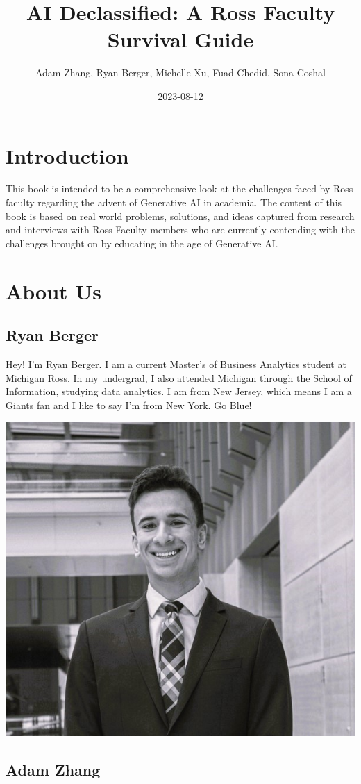 \documentclass[
]{book}
\title{AI Declassified: A Ross Faculty Survival Guide}
\author{Adam Zhang, Ryan Berger, Michelle Xu, Fuad Chedid, Sona Coshal}
\date{2023-08-12}
\begin{document}
\maketitle

{
\setcounter{tocdepth}{1}
\tableofcontents
}
\hypertarget{introduction}{%
\chapter{Introduction}\label{introduction}}

This book is intended to be a comprehensive look at the challenges faced by Ross faculty regarding the advent of Generative AI in academia. The content of this book is based on real world problems, solutions, and ideas captured from research and interviews with Ross Faculty members who are currently contending with the challenges brought on by educating in the age of Generative AI.

\hypertarget{about-us}{%
\chapter{About Us}\label{about-us}}

\hypertarget{ryan-berger}{%
\section{Ryan Berger}\label{ryan-berger}}

Hey! I'm Ryan Berger. I am a current Master's of Business Analytics student at Michigan Ross. In my undergrad, I also attended Michigan through the School of Information, studying data analytics. I am from New Jersey, which means I am a Giants fan and I like to say I'm from New York. Go Blue!

\includegraphics[width=0.4\linewidth]{rtberger}

\hypertarget{adam-zhang}{%
\section{Adam Zhang}\label{adam-zhang}}
\end{document}

